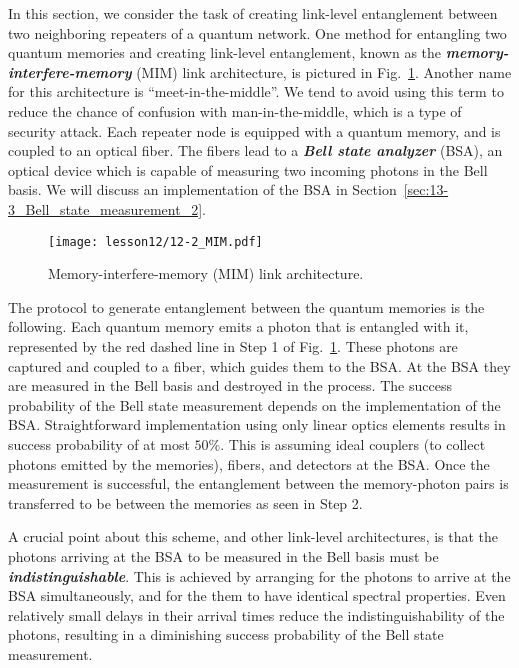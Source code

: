 In this section, we consider the task of creating link-level entanglement between two neighboring repeaters of a quantum network.
One method for entangling two quantum memories and creating link-level entanglement, known as the \emph{\textbf{memory-interfere-memory}} (MIM) link architecture, is pictured in Fig.~\ref{fig:12-2_MIM}.
Another name for this architecture is ``meet-in-the-middle''.
We tend to avoid using this term to reduce the chance of confusion with man-in-the-middle, which is a type of security attack.
Each repeater node is equipped with a quantum memory, and is coupled to an optical fiber.
The fibers lead to a \emph{\textbf{Bell state analyzer}} (BSA), an optical device which is capable of measuring two incoming photons in the Bell basis.
We will discuss an implementation of the BSA in Section~\ref{sec:13-3_Bell_state_measurement_2}.

\begin{figure}[t]
    \centering
    \texttt{[image: lesson12/12-2\_MIM.pdf]}
    \caption[MIM link architecture.]{Memory-interfere-memory (MIM) link architecture.}
    \label{fig:12-2_MIM}
\end{figure}

The protocol to generate entanglement between the quantum memories is the following.
Each quantum memory emits a photon that is entangled with it, represented by the red dashed line in Step 1 of Fig.~\ref{fig:12-2_MIM}.
These photons are captured and coupled to a fiber, which guides them to the BSA.
At the BSA they are measured in the Bell basis and destroyed in the process.
The success probability of the Bell state measurement depends on the implementation of the BSA.
Straightforward implementation using only linear optics elements results in success probability of at most $50\%$.
This is assuming ideal couplers (to collect photons emitted by the memories), fibers, and detectors at the BSA.
Once the measurement is successful, the entanglement between the memory-photon pairs is transferred to be between the memories as seen in Step 2.

A crucial point about this scheme, and other link-level architectures, is that the photons arriving at the BSA to be measured in the Bell basis must be \textit{\textbf{indistinguishable}}.
This is achieved by arranging for the photons to arrive at the BSA simultaneously, and for the them to have identical spectral properties. 
Even relatively small delays in their arrival times reduce the indistinguishability of the photons, resulting in a diminishing success probability of the Bell state measurement.

